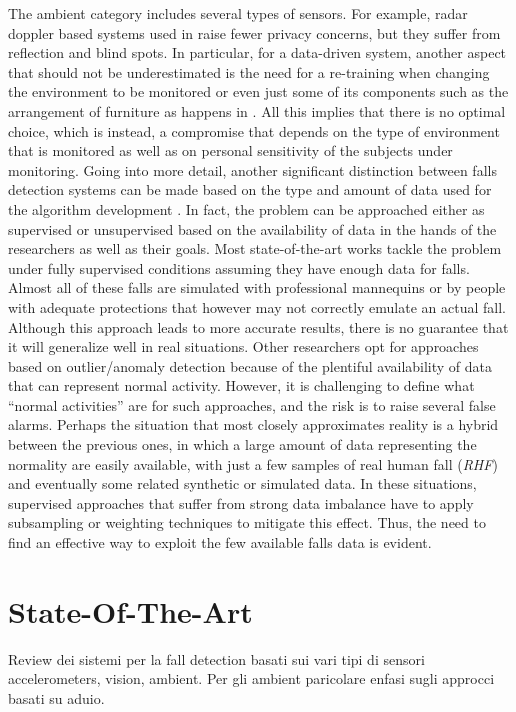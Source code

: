 The ambient category includes several types of sensors. For example, radar doppler based systems used in \cite{wu2015radar} raise fewer privacy concerns, but they suffer from reflection and blind spots. In particular, for a data-driven system, another aspect that should not be underestimated is the need for a re-training when changing the environment to be monitored or even just some of its components such as the arrangement of furniture as happens in \cite{liu2008vision}.
All this implies that there is no optimal choice, which is instead, a compromise that depends on the type of environment that is monitored as well as on personal sensitivity of the subjects under monitoring.
Going into more detail, another significant distinction between falls detection systems can be made based on the type and amount of data used for the algorithm development \cite{khan2017review}. In fact, the problem can be approached either as supervised or unsupervised based on the availability of data in the hands of the researchers as well as their goals. 
Most state-of-the-art works tackle the problem under fully supervised conditions assuming they have enough data for falls. Almost all of these falls are simulated with professional mannequins \cite{werner2011fall, zigel2009method}  or by people with adequate protections \cite{li2012microphone, popescu2008acoustic} that however may not correctly emulate an actual fall. Although this approach leads to more accurate results, there is no guarantee that it will generalize well in real situations. 
Other researchers opt for approaches based on outlier/anomaly detection \cite{khan2015unsupervised, zhang2009detecting, popescu2009acoustic} because of the plentiful availability of data that can represent normal activity. However, it is challenging to define what ``normal activities'' are for such approaches, and the risk is to raise several false alarms. %
Perhaps the situation that most closely approximates reality is a hybrid between the previous ones, in which a large amount of data representing the normality are easily available, with just a few samples of real human fall (\textit{RHF}) and eventually some related synthetic or simulated data. In these situations, supervised approaches that suffer from strong data imbalance have to apply subsampling \cite{stone2015fall} or weighting \cite{khan2017review} techniques to mitigate this effect. Thus, the need to find an effective way to exploit the few available falls data is evident.


\section{State-Of-The-Art} 
\label{sec:soa}
Review dei sistemi per la fall detection basati sui vari tipi di sensori
accelerometers, vision, ambient. Per gli ambient paricolare enfasi sugli approcci basati su aduio.

